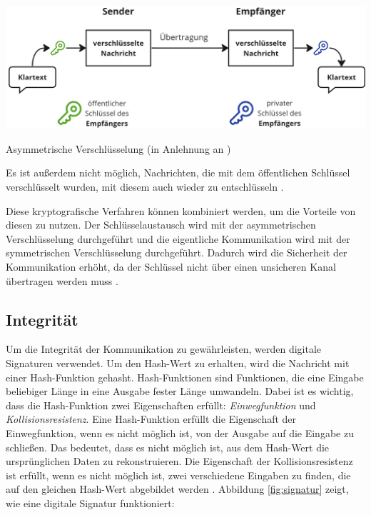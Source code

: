 \begin{center}
    \captionsetup{type=figure}
    \includegraphics[width=1\linewidth]{images/asymmetric_encryption.png}
    \caption{Asymmetrische Verschlüsselung (in Anlehnung an \cite{ElektronikKompendium_asymmetrischeVerschluesselung})}
    \label{fig:asymmetrische_verschluesselung}
\end{center}

\noindent Es ist außerdem nicht möglich, Nachrichten, die mit dem öffentlichen Schlüssel verschlüsselt wurden, mit diesem auch wieder zu entschlüsseln \parencite{ElektronikKompendium_asymmetrischeVerschluesselung}. 

Diese kryptografische Verfahren können kombiniert werden, um die Vorteile von diesen zu nutzen. Der Schlüsselaustausch wird mit der asymmetrischen Verschlüsselung durchgeführt und die eigentliche Kommunikation wird mit der symmetrischen Verschlüsselung durchgeführt. Dadurch wird die Sicherheit der Kommunikation erhöht, da der Schlüssel nicht über einen unsicheren Kanal übertragen werden muss \Parencite[S. 5-8]{Wong_KryptoPraxis}.


\subsection{Integrität}
\label{subsec:integritaet_signatur}

Um die Integrität der Kommunikation zu gewährleisten, werden digitale Signaturen verwendet. Um den Hash-Wert zu erhalten, wird die Nachricht mit einer Hash-Funktion gehasht. Hash-Funktionen sind Funktionen, die eine Eingabe beliebiger Länge in eine Ausgabe fester Länge umwandeln. Dabei ist es wichtig, dass die Hash-Funktion zwei Eigenschaften erfüllt: \textit{Einwegfunktion} und \textit{Kollisionsresistenz}. Eine Hash-Funktion erfüllt die Eigenschaft der Einwegfunktion, wenn es nicht möglich ist, von der Ausgabe auf die Eingabe zu schließen. Das bedeutet, dass es nicht möglich ist, aus dem Hash-Wert die ursprünglichen Daten zu rekonstruieren. Die Eigenschaft der Kollisionsresistenz ist erfüllt, wenn es nicht möglich ist, zwei verschiedene Eingaben zu finden, die auf den gleichen Hash-Wert abgebildet werden \parencites[S. 12-13]{Brünnler_BlockchainKurzGut}[S. 6]{Fill_BlockchainGrundlagen}. Abbildung \ref{fig:signatur} zeigt, wie eine digitale Signatur funktioniert:

